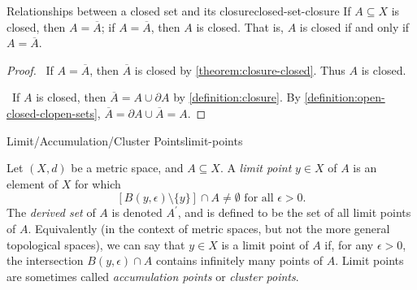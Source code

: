 \documentclass{article}
\newcommand*\iffforward{\par\boxed\Longrightarrow\ }
\newcommand*\iffbackward{\par\boxed\Longleftarrow\ }
\numberwithin{equation}{section}
\numberwithin{figure}{section}
\begin{document}
\begin{theorem}{Relationships between a closed set and its
        closure}{closed-set-closure}
    If $ A \subseteq X $ is closed, then $ A = \overline{A} $; if $ A =
    \overline{A} $, then $ A $ is closed. That is, $ A $ is closed if and only
    if $ A = \overline{A} $.
    \begin{proof}
        \iffforward If $ A = \overline{A} $, then $ \overline{A} $ is closed by
        \cref{theorem:closure-closed}. Thus $ A $ is closed.

        \iffbackward If $ A $ is closed, then $ \overline{A} = A \cup \partial A
        $ by \cref{definition:closure}. By
        \cref{definition:open-closed-clopen-sets}, $ \overline{A} = \partial A
        \cup \overline{A} = A $.
    \end{proof}
\end{theorem}
\begin{definition}{Limit/Accumulation/Cluster Points}{limit-points}
    \begin{minipage}{.6\linewidth}
        Let $ (X, d) $ be a metric space, and $ A \subseteq X $. A \emph{limit
        point} $ y \in X $ of $ A $ is an element of $ X $ for which
        \begin{equation}
            \left[ B(y, \epsilon) \setminus \{y\} \right] \cap A \neq \emptyset
            \text{ for all } \epsilon > 0.
        \end{equation}
        The \emph{derived set} of $ A $ is denoted $ A^\prime $, and is defined
        to be the set of all limit points of $ A $. Equivalently (in the context
        of metric spaces, but not the more general topological spaces), we can
        say that $ y \in X $ is a limit point of $ A $ if, for any $ \epsilon >
        0 $, the intersection $ B(y, \epsilon) \cap A $ contains infinitely many
        points of $ A $. Limit points are sometimes called \emph{accumulation
        points} or \emph{cluster points}.
    \end{minipage}\hfill
    \begin{minipage}{.35\linewidth}
        \centering
    \end{minipage}
\end{definition}
\end{document}
